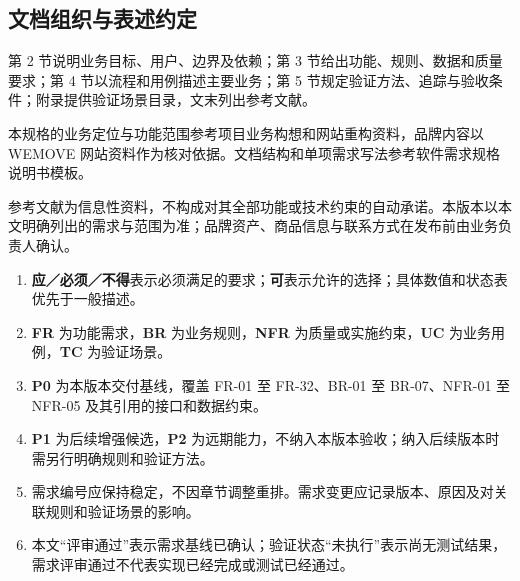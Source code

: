 \subsection{文档组织与表述约定}\label{sec:14-文档组织与表述约定}

第 2 节说明业务目标、用户、边界及依赖；第 3 节给出功能、规则、数据和质量要求；第 4 节以流程和用例描述主要业务；第 5 节规定验证方法、追踪与验收条件；附录提供验证场景目录，文末列出参考文献。

本规格的业务定位与功能范围参考项目业务构想和网站重构资料\cite{business-understanding,website-requirements}，品牌内容以 WEMOVE 网站资料作为核对依据\cite{wemove-site}。文档结构和单项需求写法参考软件需求规格说明书模板\cite{msu-srs,jam01-srs,jam01-requirement}。

参考文献为信息性资料，不构成对其全部功能或技术约束的自动承诺。本版本以本文明确列出的需求与范围为准；品牌资产、商品信息与联系方式在发布前由业务负责人确认。

\begin{enumerate}
\item {\bfseries 应／必须／不得}表示必须满足的要求；{\bfseries 可}表示允许的选择；具体数值和状态表优先于一般描述。
\item {\bfseries FR} 为功能需求，{\bfseries BR} 为业务规则，{\bfseries NFR} 为质量或实施约束，{\bfseries UC} 为业务用例，{\bfseries TC} 为验证场景。
\item {\bfseries P0} 为本版本交付基线，覆盖 FR-01 至 FR-32、BR-01 至 BR-07、NFR-01 至 NFR-05 及其引用的接口和数据约束。
\item {\bfseries P1} 为后续增强候选，{\bfseries P2} 为远期能力，不纳入本版本验收；纳入后续版本时需另行明确规则和验证方法。
\item 需求编号应保持稳定，不因章节调整重排。需求变更应记录版本、原因及对关联规则和验证场景的影响。
\item 本文“评审通过”表示需求基线已确认；验证状态“未执行”表示尚无测试结果，需求评审通过不代表实现已经完成或测试已经通过。
\end{enumerate}
